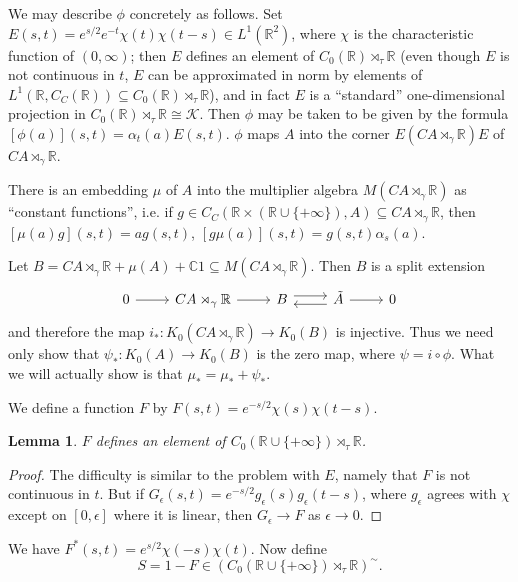 \documentclass{book}
\newtheorem{lemma}[definition]{Lemma}
\begin{document}
We may describe \(\phi\) concretely as follows. Set \(E(s,t)=e^{s/2}e^{-t}\chi(t)\chi(t-s)\in L^1(\mathbb{R}^2)\),
where \(\chi\) is the characteristic function of \((0,\infty)\); then \(E\) defines
an element of \(C_0(\mathbb{R})\rtimes_\tau\mathbb{R}\) (even though \(E\) is not continuous in \(t\), \(E\) can be approximated 
in norm by elements of \(L^1(\mathbb{R},C_C(\mathbb{R}))\subseteq C_0(\mathbb{R})\rtimes_\tau\mathbb{R}\)), and in fact \(E\) is a ``standard''
one-dimensional projection in \(C_0(\mathbb{R})\rtimes_\tau\mathbb{R}\cong\mathcal{K}\). Then 
\(\phi\) may be taken to be given by the formula \([\phi(a)](s,t)=\alpha_t(a)E(s,t)\). \(\phi\)
maps \(A\) into the corner \(E(CA\rtimes_\gamma\mathbb{R})E\) of \(CA\rtimes_\gamma\mathbb{R}\).\par
There is an embedding \(\mu\) of \(A\) into the multiplier algebra \(M(CA\rtimes_\gamma\mathbb{R})\)
as ``constant functions'', i.e. if \(g\in C_C(\mathbb{R}\times(\mathbb{R}\cup\{+\infty\}),A)\subseteq CA\rtimes_\gamma\mathbb{R}\), then 
\([\mu(a)g](s,t)=ag(s,t)\), \([g\mu(a)](s,t)=g(s,t)\alpha_s(a)\).\par
Let \(B=CA\rtimes_\gamma\mathbb{R}+\mu(A)+\mathbb{C}1\subseteq M(CA\rtimes_\gamma\mathbb{R})\). Then \(B\)
is a split extension
\[
  \begin{tikzcd}
    0\arrow[r]&CA\rtimes_\gamma\mathbb{R}\arrow[r]&B\arrow[r, shift left=0.7ex]&\tilde{A}\arrow[l, shift left=0.7ex]\arrow[r]&0
  \end{tikzcd}
\]
and therefore the map \(i_*:K_0(CA\rtimes_\gamma\mathbb{R})\to K_0(B)\) is injective. Thus we need
only show that \(\psi_*:K_0(A)\to K_0(B)\) is the zero map, where \(\psi=i\circ\phi\). What we will actually show is that
\(\mu_*=\mu_*+\psi_*\).\par
We define a function \(F\) by \(F(s,t)=e^{-s/2}\chi(s)\chi(t-s)\).
\begin{lemma}
  \(F\) defines an element of \(C_0(\mathbb{R}\cup\{+\infty\})\rtimes_\tau\mathbb{R}\).
\end{lemma}
\begin{proof}
  The difficulty is similar to the problem with \(E\), namely that \(F\) is not continuous
  in \(t\). But if \(G_\epsilon(s,t)=e^{-s/2}g_\epsilon(s)g_\epsilon(t-s)\), where \(g_\epsilon\) agrees
  with \(\chi\) except on \([0,\epsilon]\) where it is linear, then \(G_\epsilon\to F\) as \(\epsilon\to0\).
\end{proof}
We have \(F^*(s,t)=e^{s/2}\chi(-s)\chi(t)\). Now define
\[
  S=1-F\in(C_0(\mathbb{R}\cup\{+\infty\})\rtimes_\tau\mathbb{R})^\sim.
\]
\end{document}
